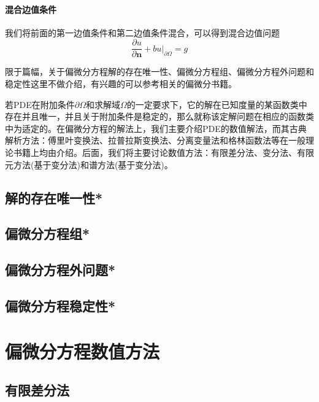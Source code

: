             \paragraph{混合边值条件}我们将前面的第一边值条件和第二边值条件混合，可以得到混合边值问题
            \[
                \frac{\partial u}{\partial \mathbf{n}} +b u \bigl|_{\partial \Omega} = g
            \]
    \par
    限于篇幅，关于偏微分方程解的存在唯一性、偏微分方程组、偏微分方程外问题和稳定性这里不做介绍，有兴趣的可以参考相关的偏微分书籍。
    \par
    若PDE在附加条件$\partial \Omega$和求解域$\Omega$的一定要求下，它的解在已知度量的某函数类中存在并且唯一，并且关于附加条件是稳定的，那么就称该定解问题在相应的函数类中为适定的。在偏微分方程的解法上，我们主要介绍PDE的数值解法，而其古典解析方法：傅里叶变换法、拉普拉斯变换法、分离变量法和格林函数法等在一般理论书籍上均由介绍。后面，我们将主要讨论数值方法：有限差分法、变分法、有限元方法(基于变分法)和谱方法(基于变分法)。

    \subsection{解的存在唯一性*}
    \subsection{偏微分方程组*}
    \subsection{偏微分方程外问题*}
    \subsection{偏微分方程稳定性*}

\section{偏微分方程数值方法}
    \subsection{有限差分法}
